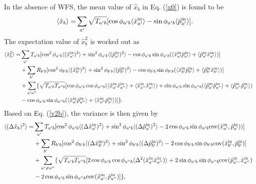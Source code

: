 \documentclass[9pt,twocolumn,twoside]{osajnl}
\begin{document}
In the absence of WFS, the mean value of $\hat{x}_b$ in Eq. (\ref{x0}) is found to be
\begin{align}
\langle \hat{x}_b \rangle =& \sum_{a'} {\sqrt{T_{a'b}} [ \cos \phi_{a'b} \langle \hat{x}_{a'}^{\rm{in}} \rangle - \sin \phi_{a'b} \langle \hat{p}_{a'}^{\rm{in}} \rangle] }.
\end{align}
The expectation value of $\hat{x}_b^2$ is worked out as
\begin{align}
\langle \hat{x}_b^2 \rangle =& \sum_{a'} {T_{a'b} [ \cos^2 \phi_{a'b} \langle (\hat{x}_{a'}^{\rm{in}})^2 \rangle + \sin^2 \phi_{a'b} \langle (\hat{p}_{a'}^{\rm{in}})^2 \rangle - \cos \phi_{a'b} \sin \phi_{a'b} (\langle \hat{x}_{a'}^{\rm{in}} \hat{p}_{a'}^{\rm{in}} \rangle + \langle \hat{p}_{a'}^{\rm{in}} \hat{x}_{a'}^{\rm{in}} \rangle) ] }\\ \nonumber
& +  \sum_{b'} {R_{b'b} [ \cos^2 \phi_{b'b} \langle (\hat{x}_{b'}^{\rm{in}})^2 \rangle + \sin^2 \phi_{b'b} \langle (\hat{p}_{b'}^{\rm{in}})^2 \rangle - \cos \phi_{b'b} \sin \phi_{b'b} (\langle \hat{x}_{b'}^{\rm{in}} \hat{p}_{b'}^{\rm{in}} \rangle + \langle \hat{p}_{b'}^{\rm{in}} \hat{x}_{b'}^{\rm{in}} \rangle) ] }\\ \nonumber
& + \sum_{a'a''} \{ \sqrt{T_{a'b} T_{a''b}} [\cos \phi_{a' b} \cos \phi_{a''b} (\langle \hat{x}_{a'}^{\rm{in}} \hat{x}_{a''}^{\rm{in}} \rangle + \langle \hat{x}_{a''}^{\rm{in}} \hat{x}_{a'}^{\rm{in}} \rangle) + \sin \phi_{a' b} \sin \phi_{a''b} (\langle \hat{p}_{a'}^{\rm{in}} \hat{p}_{a''}^{\rm{in}} \rangle + \langle \hat{p}_{a''}^{\rm{in}} \hat{p}_{a'}^{\rm{in}} \rangle) \\ \nonumber
& - \cos \phi_{a' b} \sin \phi_{a''b} (\langle \hat{x}_{a'}^{\rm{in}} \hat{p}_{a''}^{\rm{in}} \rangle + \langle \hat{x}_{a''}^{\rm{in}} \hat{p}_{a'}^{\rm{in}} \rangle) ]  \}.
\end{align}
Based on Eq. (\ref{v2b}), the variance is then given by
\begin{align}
\langle (\Delta \hat{x}_{b})^2 \rangle =& 
\sum_{a'}{T_{a'b}[\cos^2 \phi_{a'b}\langle (\Delta \hat{x}_{a'}^{\rm{in}})^2 \rangle + \sin^2 \phi_{a'b}\langle (\Delta \hat{p}_{a'}^{\rm{in}})^2 \rangle - 2\cos \phi_{a'b} \sin \phi_{a'b} {\rm{cov}}(\hat{x}_{a'}^{\rm{in}}, \hat{p}_{a'}^{\rm{in}}))]} \\ \nonumber
& + \sum_{b'}{R_{b'b}[\cos^2 \phi_{b'b}\langle (\Delta \hat{x}_{b'}^{\rm{in}})^2 \rangle + \sin^2 \phi_{b'b}\langle (\Delta \hat{p}_{b'}^{\rm{in}})^2 \rangle - 2\cos \phi_{b'b} \sin \phi_{b'b} {\rm{cov}}(\hat{x}_{b'}^{\rm{in}}, \hat{p}_{b'}^{\rm{in}}) ]}\\ \nonumber
& + \sum_{a'\neq a''} \{ \sqrt{T_{a'b} T_{a''b}} [2\cos \phi_{a' b} \cos \phi_{a''b}  \langle \Delta^2(\hat{x}_{a'}^{\rm{in}} \hat{x}_{a''}^{\rm{in}}) \rangle + 2\sin \phi_{a' b} \sin \phi_{a''b}  {\rm{cov}}(\hat{p}_{a'}^{\rm{in}}, \hat{x}_{a''}^{\rm{in}}) \\ \nonumber
&-2\cos \phi_{a'b} \sin \phi_{a''b} {\rm{cov}}(\hat{x}_{a'}^{\rm{in}}, \hat{p}_{a''}^{\rm{in}})] \},
\end{align}
\end{document}

